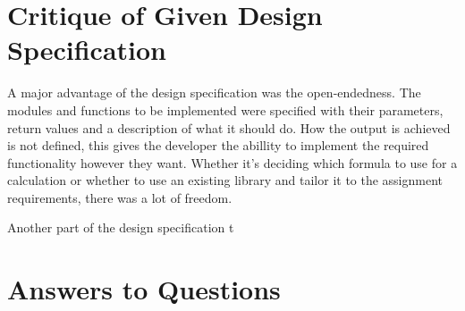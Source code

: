 \documentclass[12pt]{article}
\begin{document}
\section{Critique of Given Design Specification}

A major advantage of the design specification was the open-endedness. The modules and functions to be implemented were specified with their parameters, return values and a description of what it should do. How the output is achieved is not defined, this gives the developer the abillity to implement the required functionality however they want. Whether it's deciding which formula to use for a calculation or whether to use an existing library and tailor it to the assignment requirements, there was a lot of freedom. 

Another part of the design specification t

\section{Answers to Questions}
\end{document}
